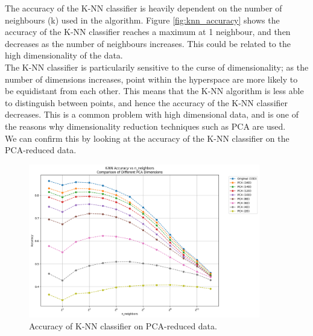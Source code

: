 \documentclass[12pt]{article}
\begin{document}
The accuracy of the K-NN classifier is heavily dependent on the number of neighbours (k) used in the algorithm. Figure \ref{fig:knn_accuracy} shows the accuracy of the K-NN classifier reaches a maximum at 1 neighbour, and then decreases as the number of neighbours increases. This could be related to the high dimensionality of the data.
\\
The K-NN classifier is particularily sensitive to the curse of dimensionality; as the number of dimensions increases, point within the hyperspace are more likely to be equidistant from each other. This means that the K-NN algorithm is less able to distinguish between points, and hence the accuracy of the K-NN classifier decreases. This is a common problem with high dimensional data, and is one of the reasons why dimensionality reduction techniques such as PCA are used.
\\

We can confirm this by looking at the accuracy of the K-NN classifier on the PCA-reduced data. 

\begin{figure}[h!]
\centering
\includegraphics[width=0.9\textwidth]{figures/knn_accuracy_pca.png}
\caption{Accuracy of K-NN classifier on PCA-reduced data.}
\label{fig:knn_accuracy_pca}
\end{figure}
\end{document}
